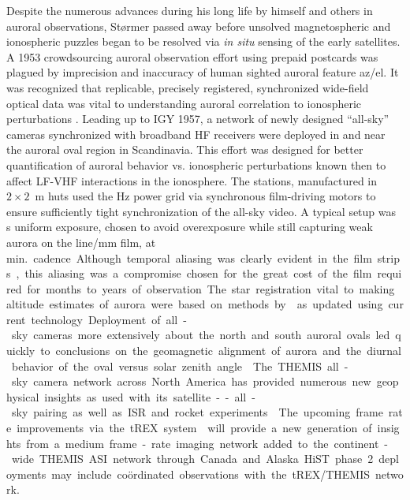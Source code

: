 Despite the numerous advances during his long life by himself and others in auroral observations, Størmer passed away before unsolved magnetospheric and ionospheric puzzles began to be resolved via \textit{in situ} sensing of the early satellites.
A 1953 crowdsourcing auroral observation effort using prepaid postcards was plagued by imprecision and inaccuracy of human sighted auroral feature az/el.
It was recognized that replicable, precisely registered, synchronized wide-field optical data was vital to understanding auroral correlation to ionospheric perturbations \citep{birkeland1908,stormer1930,stoffregen1955}.
Leading up to IGY 1957, a network of newly designed ``all-sky'' cameras synchronized with broadband HF receivers were deployed in and near the auroral oval region in Scandinavia.
This effort was designed for better quantification of auroral behavior vs. ionospheric perturbations known then to affect LF-VHF interactions in the ionosphere.
The stations, manufactured in $2\times2$~m huts used the \unit[50]{Hz} power grid via synchronous film-driving motors to ensure sufficiently tight synchronization of the all-sky video. 
A typical setup was \unit[7]{s} uniform exposure, chosen to avoid overexposure while still capturing weak aurora on the \unit[100]{line/mm} film, at \unit[1]{min.} cadence.
Although temporal aliasing was clearly evident in the film strips, this aliasing was a compromise chosen for the great cost of the film required for months to years of observation.
The star registration vital to making altitude estimates of aurora were based on methods by \citet{stormer1930} as updated using current technology.
Deployment of all-sky cameras more extensively about the north and south auroral ovals led quickly to conclusions on the geomagnetic alignment of aurora and the diurnal behavior of the oval versus solar zenith angle \citep{denholm1961}.
The THEMIS all-sky camera network across North America has provided numerous new geophysical insights as used with its satellite--all-sky pairing as well as ISR and rocket experiments \citep{donovan2006}.
The upcoming frame rate improvements via the tREX system \citep{liang2016} will provide a new generation of insights from a medium frame-rate imaging network added to the continent-wide THEMIS ASI network through Canada and Alaska.
HiST phase 2 deployments may include coördinated observations with the tREX/THEMIS network.

